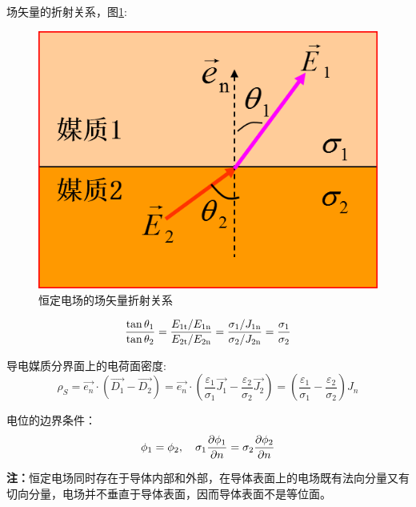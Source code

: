 场矢量的折射关系，图\ref{fig:steadyelecfieldfraction}:
\begin{figure}[h]
	\centering
	\includegraphics[keepaspectratio]{pics/恒定电场的场矢量折射关系}
	\caption{恒定电场的场矢量折射关系}
	\label{fig:steadyelecfieldfraction}
\end{figure}

$${{\tan {\theta _1}} \over {\tan {\theta _2}}} = {{{E_{{\rm{1t}}}}/{E_{{\rm{1n}}}}} \over {{E_{{\rm{2t}}}}/{E_{{\rm{2n}}}}}} = {{{\sigma _{\rm{1}}}/{J_{{\rm{1n}}}}} \over {{\sigma _{\rm{2}}}/{J_{{\rm{2n}}}}}} = {{{\sigma _1}} \over {{\sigma _2}}}$$

导电媒质分界面上的电荷面密度:
$$ \rho_S = \overrightarrow{e_n} \cdot (\vec{D_1} - \vec{D_2}) = \overrightarrow{e_n}\cdot (\frac{\varepsilon_1}{\sigma_1}\vec{J_1} - \frac{\varepsilon_2}{\sigma_2}\vec{J_2}) = (\frac{\varepsilon_1}{\sigma_1} - \frac{\varepsilon_2}{\sigma_2})J_n $$

电位的边界条件：
$${\phi _1} = {\phi _2},\quad {\sigma _1}{{\partial {\phi _1}} \over {\partial n}} = {\sigma _2}{{\partial {\phi _2}} \over {\partial n}}$$

\textbf{注：}恒定电场同时存在于导体内部和外部，在导体表面上的电场既有法向分量又有切向分量，电场并不垂直于导体表面，因而导体表面不是等位面。


